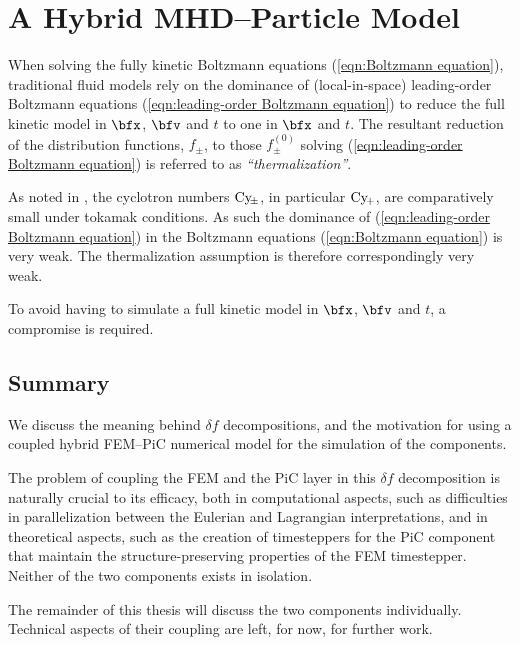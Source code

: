 \chapter{A Hybrid MHD--Particle Model}\label{cha:delta f corrections}
    When solving the fully kinetic Boltzmann equations (\ref{eqn:Boltzmann equation}), traditional fluid models rely on the dominance of (local-in-space) leading-order Boltzmann equations (\ref{eqn:leading-order Boltzmann equation}) to reduce the full kinetic model in $\bfx$, $\bfv$ and $t$ to one in $\bfx$ and $t$. The resultant reduction of the distribution functions, $f_{\pm}$, to those $f_{\pm}^{(0)}$ solving (\ref{eqn:leading-order Boltzmann equation}) is referred to as \emph{``thermalization''}.
    
    As noted in \cite{addendum}, the cyclotron numbers $\mathrm{Cy}\!_{\pm}$, in particular $\mathrm{Cy}\!_{+}$, are comparatively small under tokamak conditions. As such the dominance of (\ref{eqn:leading-order Boltzmann equation}) in the Boltzmann equations (\ref{eqn:Boltzmann equation}) is very weak. The thermalization assumption is therefore correspondingly very weak.

    To avoid having to simulate a full kinetic model in $\bfx$, $\bfv$ and $t$, a compromise is required.


    
    
    
    


    \section*{Summary}
        We discuss the meaning behind $\delta\!f$ decompositions, and the motivation for using a coupled hybrid FEM--PiC numerical model for the simulation of the components.
        
        The problem of coupling the FEM and the PiC layer in this $\delta\!f$ decomposition is naturally crucial to its efficacy, both in computational aspects, such as difficulties in parallelization between the Eulerian and Lagrangian interpretations, and in theoretical aspects, such as the creation of timesteppers for the PiC component that maintain the structure-preserving properties of the FEM timestepper. Neither of the two components exists in isolation.
        
        The remainder of this thesis will discuss the two components individually. Technical aspects of their coupling are left, for now, for further work.
    